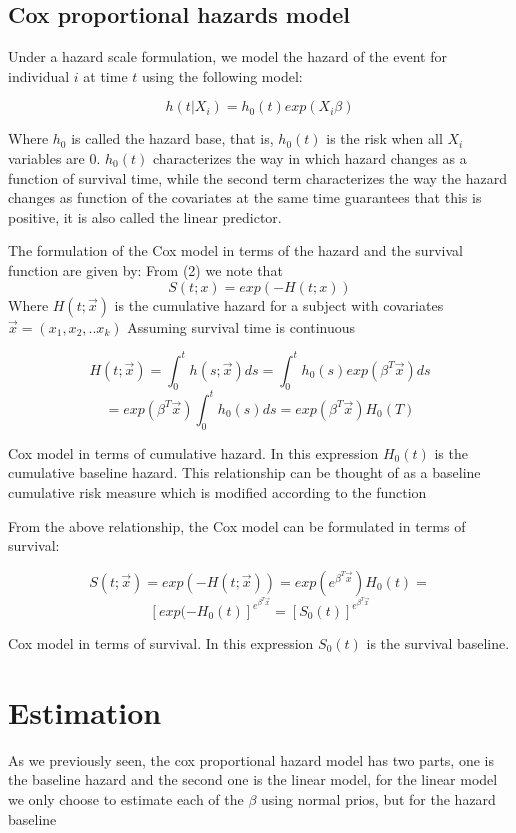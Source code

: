 \documentclass[
  twocolumn]{article}
\begin{document}
\hypertarget{cox-proportional-hazards-model}{%
\subsection{Cox proportional hazards
model}\label{cox-proportional-hazards-model}}

Under a hazard scale formulation, we model the hazard of the event for
individual \(i\) at time \(t\) using the following model:

\[h(t|X_i)=h_0(t)exp(X_i\beta)\]

Where \(h_0\) is called the hazard base, that is, \(h_0(t)\) is the risk
when all \(X_i\) variables are 0. \(h_0(t)\) characterizes the way in
which hazard changes as a function of survival time, while the second
term characterizes the way the hazard changes as function of the
covariates at the same time guarantees that this is positive, it is also
called the linear predictor.

The formulation of the Cox model in terms of the hazard and the survival
function are given by: From (2) we note that \[S(t;x)=exp(-H(t;x))\]
Where \(H(t;\vec{x})\) is the cumulative hazard for a subject with
covariates \(\vec{x}=(x_1,x_2,..x_k)\) Assuming survival time is
continuous

\[H(t;\vec{x})=\int_{0}^{t} h(s;\vec{x})ds=\int_{0}^{t} h_0(s)exp(\beta^T\vec{x})ds\]
\[=exp(\beta^T\vec{x})\int_{0}^{t} h_0(s)ds=
exp(\beta^T\vec{x})H_0(T)\]

Cox model in terms of cumulative hazard. In this expression \(H_0(t)\)
is the cumulative baseline hazard. This relationship can be thought of
as a baseline cumulative risk measure which is modified according to the
function

From the above relationship, the Cox model can be formulated in terms of
survival:

\[S(t;\vec{x})=exp(-H(t;\vec{x}))=exp(e^{\beta^T\vec{x}})H_0(t)=\]
\[[exp(-H_0(t)]^{e^{\beta^T\vec{x}}}=[S_0(t)]^{e^{\beta^T\vec{x}}}\]

Cox model in terms of survival. In this expression \(S_0(t)\) is the
survival baseline.

\hypertarget{estimation}{%
\section{Estimation}\label{estimation}}

As we previously seen, the cox proportional hazard model has two parts,
one is the baseline hazard and the second one is the linear model, for
the linear model we only choose to estimate each of the \(\beta\) using
normal prios, but for the hazard baseline
\end{document}
